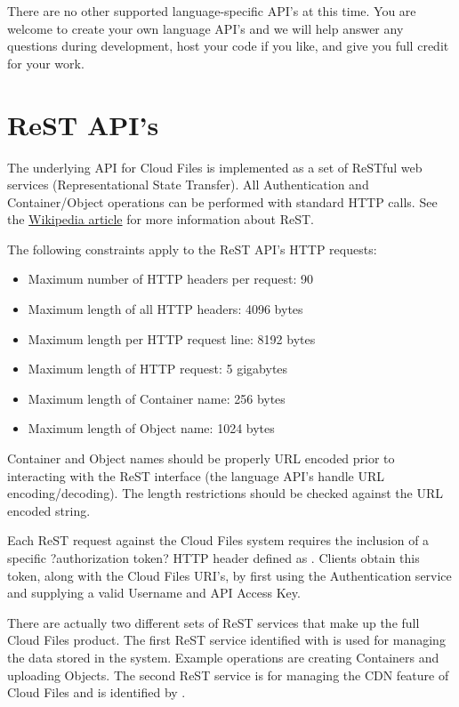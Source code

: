\documentclass[letterpaper,10pt,english]{manual}
\begin{document}
There are no other supported language-specific API's at this time.  You
are welcome to create your own language API's and we will help answer any
questions during development, host your code if you like, and give you
full credit for your work.


\chapter{ReST API's}

The underlying API for Cloud Files is implemented as a set of ReSTful
web services (Representational State Transfer). All Authentication and
Container/Object operations can be performed with standard HTTP calls.
See the \href{http://en.wikipedia.org/wiki/Representational\_State\_Transfer}{Wikipedia article} for more information about ReST.

The following constraints apply to the ReST API's HTTP requests:
\begin{itemize}
\item {} 
Maximum number of HTTP headers per request: 90

\item {} 
Maximum length of all HTTP headers: 4096 bytes

\item {} 
Maximum length per HTTP request line: 8192 bytes

\item {} 
Maximum length of HTTP request: 5 gigabytes

\item {} 
Maximum length of Container name: 256 bytes

\item {} 
Maximum length of Object name: 1024 bytes

\end{itemize}

Container and Object names should be properly URL encoded prior
to interacting with the ReST interface (the language API's handle
URL encoding/decoding).  The length restrictions should be checked
against the URL encoded string.

Each ReST request against the Cloud Files system requires the inclusion of
a specific ?authorization token? HTTP header defined as .
Clients obtain this token, along with the Cloud Files URI's, by first
using the Authentication service and supplying a valid Username and API
Access Key.

There are actually two different sets of ReST services that make up the
full Cloud Files product.  The first ReST service identified with
 is used for managing the data stored in the system.
Example operations are creating Containers and uploading Objects.  The
second ReST service is for managing the CDN feature of Cloud Files and is
identified by .
\end{document}
